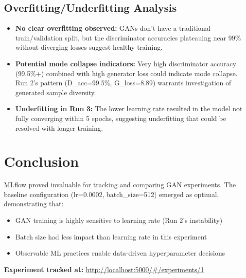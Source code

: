 \documentclass[11pt,a4paper]{article}
\begin{document}
\subsection{Overfitting/Underfitting Analysis}

\begin{itemize}
    \item \textbf{No clear overfitting observed:} GANs don't have a traditional train/validation split, but the discriminator accuracies plateauing near 99\% without diverging losses suggest healthy training.
    
    \item \textbf{Potential mode collapse indicators:} Very high discriminator accuracy (99.5\%+) combined with high generator loss could indicate mode collapse. Run 2's pattern (D\_acc=99.5\%, G\_loss=8.89) warrants investigation of generated sample diversity.
    
    \item \textbf{Underfitting in Run 3:} The lower learning rate resulted in the model not fully converging within 5 epochs, suggesting underfitting that could be resolved with longer training.
\end{itemize}

\section{Conclusion}

MLflow proved invaluable for tracking and comparing GAN experiments. The baseline configuration (lr=0.0002, batch\_size=512) emerged as optimal, demonstrating that:

\begin{itemize}
    \item GAN training is highly sensitive to learning rate (Run 2's instability)
    \item Batch size had less impact than learning rate in this experiment
    \item Observable ML practices enable data-driven hyperparameter decisions
\end{itemize}

\vspace{1em}
\noindent\textbf{Experiment tracked at:} \url{http://localhost:5000/#/experiments/1}
\end{document}
